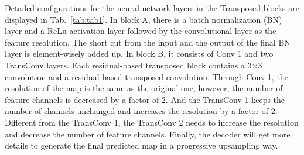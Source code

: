 \documentclass[letterpaper, 10 pt, conference]{ieeeconf}  \usepackage{graphicx}
\begin{document}
 Detailed configurations for the neural network layers in the Transposed blocks are displayed in Tab.~\ref{tab:tab1}. In block A, there is a batch normalization (BN) layer \cite{ioffe2015batch} and a ReLu activation layer \cite{nair2010rectified} followed by the convolutional layer as the feature resolution. The short cut from the input and the output of the final BN layer is element-wisely added up. In block B, it consists of Conv 1 and two TransConv layers. Each residual-based transposed block contains a 3×3 convolution and a residual-based transposed convolution. Through Conv 1, the resolution of the map is the same as the original one, however, the number of feature channels is decreased by a factor of 2. And the TransConv 1 keeps the number of channels unchanged and increases the resolution by a factor of 2. Different from the TransConv 1, the TransConv 2 needs to increase the resolution and decrease the number of feature channels. Finally, the decoder will get more details to generate the final predicted map in a progressive upsampling way.
\end{document}
